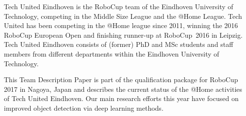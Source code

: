 Tech United Eindhoven is the RoboCup team of the Eindhoven University of Technology, competing in the Middle Size League and the @Home League. Tech United has been competing in the @Home league since 2011, winning the 2016 RoboCup European Open and finishing runner-up at RoboCup~2016 in Leipzig.
Tech United Eindhoven consists of (former) PhD and MSc students and staff members from different departments within the Eindhoven University of Technology.

This Team Description Paper is part of the qualification package for RoboCup 2017 in Nagoya, Japan and describes the current status of the @Home activities of Tech United Eindhoven.
Our main research efforts this year have focused on improved object detection via deep learning methods.
